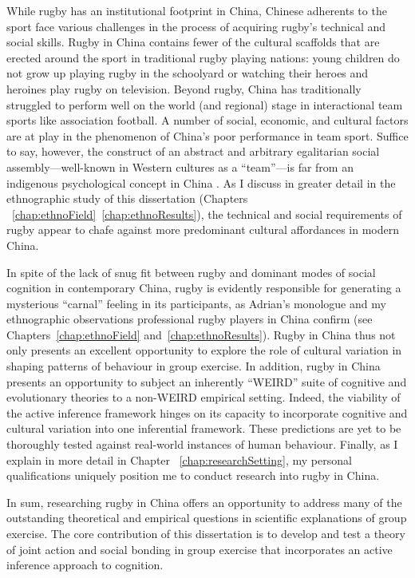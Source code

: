 \begin{CJK}{UTF8}{gbsn}
While rugby has an institutional footprint in China, Chinese adherents to the sport face various challenges in the process of acquiring rugby's technical and social skills.  Rugby in China contains fewer of the cultural scaffolds that are erected around the sport in traditional rugby playing nations: young children do not grow up playing rugby in the schoolyard or watching their heroes and heroines play rugby on television.  Beyond rugby, China has traditionally struggled to perform well on the world (and regional) stage in interactional team sports like association football.  A number of social, economic, and cultural factors are at play in the phenomenon of China's poor performance in team sport.  Suffice to say, however, the construct of an abstract and arbitrary egalitarian social assembly---well-known in Western cultures as a ``team''---is far from an indigenous psychological concept in China \cite[instead, the family functions as a primary metaphor for social interaction][]{Liu2009}.  As I discuss in greater detail in the ethnographic study of this dissertation (Chapters ~\ref{chap:ethnoField}\nobreakdash~\ref{chap:ethnoResults}), the technical and social requirements of rugby appear to chafe against more predominant cultural affordances in modern China.

In spite of the lack of snug fit between rugby and dominant modes of social cognition in contemporary China, rugby is evidently responsible for generating a mysterious ``carnal'' feeling in its participants, as Adrian's monologue and my ethnographic observations professional rugby players in China confirm (see Chapters~\ref{chap:ethnoField} and~\ref{chap:ethnoResults}).  Rugby in China thus not only presents an excellent opportunity to explore the role of cultural variation in shaping patterns of behaviour in group exercise.  In addition, rugby in China presents an opportunity to subject an inherently ``WEIRD'' \citep[Western, Educated, Industrial, Rich, and Democratic; cf.][]{Henrich2010d} suite of cognitive and evolutionary theories to a non-WEIRD empirical setting.  Indeed, the viability of the active inference framework hinges on its capacity to incorporate cognitive and cultural variation into one inferential framework.  These predictions are yet to be thoroughly tested against real-world instances of human behaviour.  Finally, as I explain in more detail in Chapter ~\ref{chap:researchSetting}, my personal qualifications uniquely position me to conduct research into rugby in China.

In sum, researching rugby in China offers an opportunity to address many of the outstanding theoretical and empirical questions in scientific explanations of group exercise.  The core contribution of this dissertation is to develop and test a theory of joint action and social bonding in group exercise that incorporates an active inference approach to cognition.




\end{CJK}
